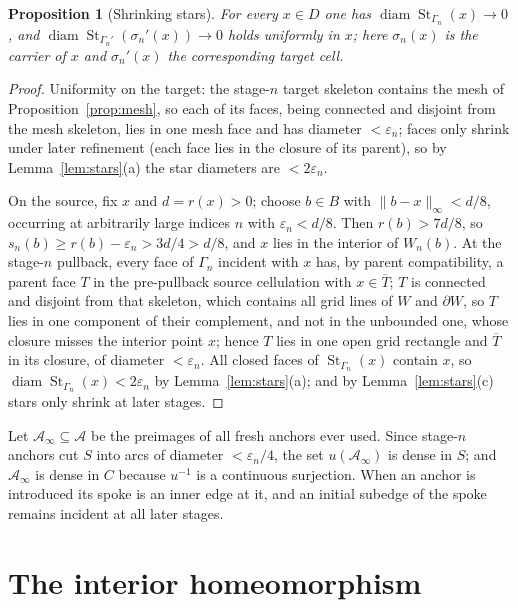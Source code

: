 \documentclass[11pt,a4paper]{article}
\theoremstyle{jsplain}
\newtheorem{proposition}[theorem]{Proposition}
\theoremstyle{jsdefn}
\newcommand{\St}{\operatorname{St}}
\newcommand{\diam}{\operatorname{diam}}
\begin{document}
\begin{proposition}[Shrinking stars]\label{prop:shrink}
For every $x\in D$ one has $\diam\St_{\Gamma_n}(x)\to0$, and
$\diam\St_{\Gamma_n'}(\sigma_n'(x))\to0$ holds uniformly in $x$;
here
$\sigma_n(x)$ is the carrier of $x$ and $\sigma_n'(x)$ the
corresponding target cell.
\end{proposition}
\begin{proof}
Uniformity on the target: the stage-$n$ target skeleton contains the
mesh of Proposition~\ref{prop:mesh}, so each of its faces, being
connected and disjoint from the mesh skeleton, lies in one mesh face
and has diameter $<\varepsilon_n$; faces only shrink under later
refinement
(each face lies in the closure of its parent), so by
Lemma~\ref{lem:stars}(a) the star diameters are $<2\varepsilon_n$.

On the source, fix $x$ and $d=r(x)>0$; choose $b\in B$ with
$\|b-x\|_\infty<d/8$, occurring at arbitrarily large indices $n$ with
$\varepsilon_n<d/8$. Then $r(b)>7d/8$, so
$s_n(b)\ge r(b)-\varepsilon_n>3d/4>d/8$, and $x$ lies in the interior
of $W_n(b)$. At the stage-$n$ pullback, every face of $\Gamma_n$
incident with $x$ has, by parent compatibility, a parent face $T$ in
the pre-pullback source cellulation with $x\in\overline T$; $T$ is
connected and disjoint from that skeleton, which contains all grid
lines of $W$ and $\partial W$, so $T$ lies in one component of their
complement, and not in the unbounded one, whose closure misses the
interior point $x$; hence $T$ lies in one open grid rectangle and
$\overline T$ in its closure, of diameter $<\varepsilon_n$. All closed faces of $\St_{\Gamma_n}(x)$ contain $x$, so
$\diam\St_{\Gamma_n}(x)<2\varepsilon_n$ by Lemma~\ref{lem:stars}(a);
and by Lemma~\ref{lem:stars}(c) stars only shrink at later stages.
\end{proof}

Let $\mathcal A_\infty\subseteq\mathcal A$ be the preimages of all fresh anchors ever
used. Since stage-$n$ anchors cut $S$ into arcs of diameter
$<\varepsilon_n/4$, the set $u(\mathcal A_\infty)$ is dense in $S$; and
$\mathcal A_\infty$ is dense in $C$ because $u^{-1}$ is a continuous surjection.
When an anchor is introduced its spoke is an inner edge at it,
and an initial subedge of the spoke remains incident at all later
stages.

\section{The interior homeomorphism}\label{sec:interior}
\end{document}
